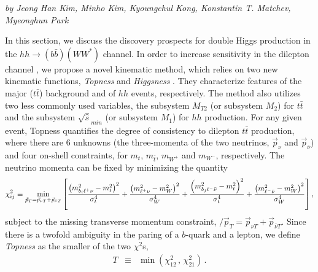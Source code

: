 


\textit{by Jeong Han Kim, Minho Kim, Kyoungchul Kong, Konstantin T. Matchev, Myeonghun Park}

\newcommand{\mptvec}{{/\!\!\!\vec{ p}_T}}


In this section, we discuss the discovery prospects for double Higgs production in the $hh \to (b\bar b) (W W^*)$ channel. In order to increase sensitivity in the dilepton channel \cite{CMS:2015nat,CMS:2017cwx,Adhikary:2017jtu}, we propose a novel kinematic method, which relies on two new kinematic functions, {\it Topness} and {\it Higgsness} \cite{Kim:2018cxf}. They characterize features of the major ($t\bar t$) background and of $hh$ events, respectively. The method also utilizes two less commonly used variables, the subsystem $M_{T2}$ (or subsystem $M_2$) \cite{Lester:1999tx,Burns:2008va,Barr:2011xt} for $t\bar t$ and the subsystem $\sqrt{\hat {s}}_{min}$ (or subsystem $M_1$) \cite{Konar:2008ei,Konar:2010ma,Barr:2011xt} for $hh$ production.
%
For any given event, Topness \cite{Graesser:2012qy,Kim:2018cxf} quantifies the degree of consistency to dilepton $t\bar t$ production, where there are 6 unknowns (the three-momenta of the two neutrinos, $\vec p_{\nu}$ and $\vec p_{\bar\nu}$) and four on-shell constraints, for
$m_t$, $m_{\bar t}$, $m_{W^+}$ and $m_{W^-}$, respectively. The neutrino momenta can be fixed by minimizing the quantity 
%
\begin{eqnarray}
\chi^2_{ij} \equiv \min_{\tiny \mptvec = \vec p_{\nu T} + \vec p_{ \bar\nu T}}  \left [ 
\frac{\left ( m^2_{b_i \ell^+ \nu} - m^2_t \right )^2}{\sigma_t^4}    +
\frac{\left ( m^2_{\ell^+ \nu} - m^2_W \right )^2}{\sigma_W^4}   \label{eq:tt}  
 + \frac{\left ( m^2_{b_j \ell^- \bar \nu} - m^2_t \right )^2}{\sigma_t^4}  +
\frac{\left ( m^2_{\ell^- \bar\nu} - m^2_W \right )^2}{\sigma_W^4}   \right ]  , 
\end{eqnarray}
%
subject to the missing transverse momentum constraint, $ \mptvec = \vec p_{\nu T} + \vec p_{ \bar\nu T}$. 
Since there is a twofold ambiguity in the paring of a $b$-quark and a lepton, we define {\it Topness} as the smaller of the two $\chi^2$s,
\begin{eqnarray}
T &\equiv&  { \min} \left ( \chi^2_{12} \, , \, \chi^2_{21} \right ) \, .
\end{eqnarray}

